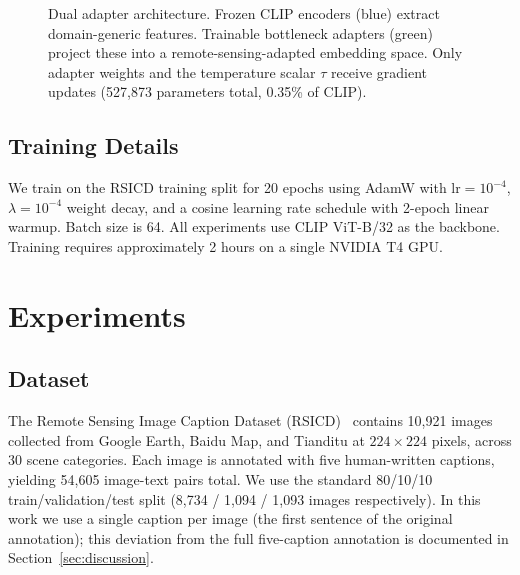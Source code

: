 \documentclass[review,12pt]{elsarticle}
\begin{document}
\begin{figure}[t]
{%
}
\caption{Dual adapter architecture. Frozen CLIP encoders (blue) extract
         domain-generic features. Trainable bottleneck adapters (green)
         project these into a remote-sensing-adapted embedding space.
         Only adapter weights and the temperature scalar $\tau$ receive
         gradient updates (527,873 parameters total, 0.35\% of CLIP).}
\label{fig:arch}
\end{figure}

\subsection{Training Details}
We train on the RSICD training split for 20 epochs using AdamW with
$\text{lr}=10^{-4}$, $\lambda=10^{-4}$ weight decay, and a cosine learning rate
schedule with 2-epoch linear warmup. Batch size is 64. All experiments use
CLIP ViT-B/32 as the backbone. Training requires approximately 2 hours on a
single NVIDIA T4 GPU.

\section{Experiments}
\label{sec:experiments}

\subsection{Dataset}
The Remote Sensing Image Caption Dataset (RSICD)~\cite{lu2017exploring}
contains 10,921 images collected from Google Earth, Baidu Map, and Tianditu
at $224\times224$ pixels, across 30 scene categories. Each image is
annotated with five human-written captions, yielding 54,605 image-text pairs
total. We use the standard 80/10/10 train/validation/test split
(8,734 / 1,094 / 1,093 images respectively). In this work we use a single
caption per image (the first sentence of the original annotation); this
deviation from the full five-caption annotation is documented in
Section~\ref{sec:discussion}.
\end{document}
